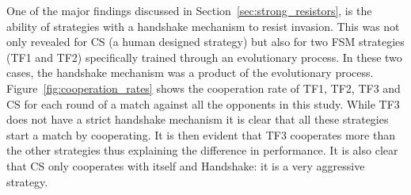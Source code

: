 \documentclass[10pt,journal]{IEEEtran}
\begin{document}
One of the major findings discussed in Section~\ref{sec:strong_resistors}, is
the ability of strategies with a handshake mechanism to resist invasion. This
was not only revealed for CS (a human designed strategy) but also for
two FSM strategies (TF1 and TF2) specifically trained through an evolutionary
process. In these two cases, the handshake mechanism was a product of the
evolutionary process. Figure~\ref{fig:cooperation_rates} shows the cooperation
rate of TF1, TF2, TF3 and CS
for each round of a match against all the opponents in this study. While TF3
does not have a strict handshake mechanism it is clear that all these strategies
start a match by cooperating. It is then evident that TF3 cooperates more than
the other strategies thus explaining the difference in performance. It is also
clear that CS only cooperates with itself and Handshake: it is a very aggressive
strategy.
\end{document}
